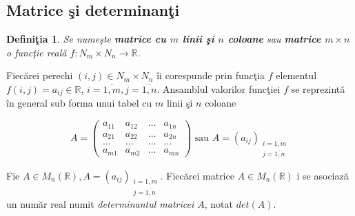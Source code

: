 \documentclass{article}
\newtheorem{definition}{Definiţia}
\begin{document}
\subsection*{Matrice şi determinanţi}

\begin{definition}
	Se numeşte \textbf{matrice cu $m$ linii şi $n$ coloane} sau \textbf{matrice $m \times n$} o funcţie reală $f : N_m \times N_n \to \mathbb{R}$.
\end{definition}

Fiecărei perechi $(i, j) \in N_m \times N_n$ îi corespunde prin funcţia $f$ elementul $f(i, j) = a_{ij} \in \mathbb{R}$, $i=\overline{1,m}, j=\overline{1,n}$. Ansamblul valorilor funcţiei $f$ se reprezintă în general sub forma unui tabel cu $m$ linii şi $n$ coloane

\begin{equation*}
	A = \begin{pmatrix}
		a_{11} & a_{12} & \ldots & a_{1n}\\
		a_{21} & a_{22} & \ldots & a_{2n}\\
		\ldots & \ldots & \ldots & \ldots \\
		a_{m1} & a_{m2} & \ldots & a_{mn}
\end{pmatrix}
	\text{ sau }
	A = (a_{ij})_{\substack{i=\overline{1, m}\\j=\overline{1, n}}}
\end{equation*}

Fie $A \in M_n(\mathbb{R}), A = (a_{ij})_{\substack{i=\overline{1, m}\\j=\overline{1, n}}}$. Fiecărei matrice $A \in M_n(\mathbb{R})$ i se asociază un număr real numit \textit{determinantul matricei $A$}, notat $det(A)$.
\end{document}

